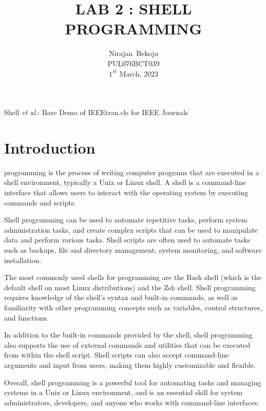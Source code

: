 \documentclass[journal,onecolumn]{IEEEtran}
\begin{document}
\title{LAB 2 : SHELL PROGRAMMING}

\author{Nirajan~Bekoju \\ PUL076BCT039 \\ $1^{st}$ March, 2023}

%
{Shell \MakeLowercase{\textit{et al.}}: Bare Demo of IEEEtran.cls for IEEE Journals}

\maketitle

\IEEEpeerreviewmaketitle

\section{Introduction}
 programming is the process of writing computer programs that are executed in a shell environment, typically a Unix or Linux shell. A shell is a command-line interface that allows users to interact with the operating system by executing commands and scripts.

Shell programming can be used to automate repetitive tasks, perform system administration tasks, and create complex scripts that can be used to manipulate data and perform various tasks. Shell scripts are often used to automate tasks such as backups, file and directory management, system monitoring, and software installation.

The most commonly used shells for programming are the Bash shell (which is the default shell on most Linux distributions) and the Zsh shell. Shell programming requires knowledge of the shell's syntax and built-in commands, as well as familiarity with other programming concepts such as variables, control structures, and functions.

In addition to the built-in commands provided by the shell, shell programming also supports the use of external commands and utilities that can be executed from within the shell script. Shell scripts can also accept command-line arguments and input from users, making them highly customizable and flexible.

Overall, shell programming is a powerful tool for automating tasks and managing systems in a Unix or Linux environment, and is an essential skill for system administrators, developers, and anyone who works with command-line interfaces.
\end{document}
